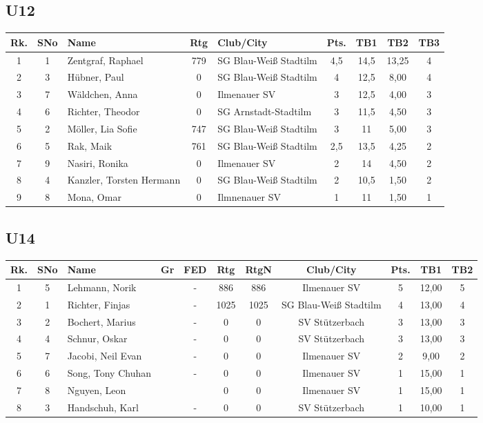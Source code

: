\documentclass[a4paper,ngerman]{tui-algo-seminar}
\begin{document}
\subsection{U12}
\begin{center}
	\begin{tabular}{|c|c|l|c|l|c|c|c|c|}
		\hline
		\textbf{Rk.} & \textbf{SNo} & \textbf{Name} & \textbf{Rtg} & \textbf{Club/City} & \textbf{Pts.} & \textbf{TB1} & \textbf{TB2} & \textbf{TB3} \\
		\hline
		1 & 1 & Zentgraf, Raphael & 779 & SG Blau-Weiß Stadtilm & 4,5 & 14,5 & 13,25 & 4 \\
		2 & 3 & Hübner, Paul & 0 & SG Blau-Weiß Stadtilm & 4 & 12,5 & 8,00 & 4 \\
		3 & 7 & Wäldchen, Anna & 0 & Ilmenauer SV & 3 & 12,5 & 4,00 & 3 \\
		4 & 6 & Richter, Theodor & 0 & SG Arnstadt-Stadtilm & 3 & 11,5 & 4,50 & 3 \\
		5 & 2 & Möller, Lia Sofie & 747 & SG Blau-Weiß Stadtilm & 3 & 11 & 5,00 & 3 \\
		6 & 5 & Rak, Maik & 761 & SG Blau-Weiß Stadtilm & 2,5 & 13,5 & 4,25 & 2 \\
		7 & 9 & Nasiri, Ronika & 0 & Ilmenauer SV & 2 & 14 & 4,50 & 2 \\
		8 & 4 & Kanzler, Torsten Hermann & 0 & SG Blau-Weiß Stadtilm & 2 & 10,5 & 1,50 & 2 \\
		9 & 8 & Mona, Omar & 0 & Ilmnenauer SV & 1 & 11 & 1,50 & 1 \\
		\hline
	\end{tabular}
\end{center}

\subsection{U14}
\begin{center}
	\begin{tabular}{|c|c|l|c|c|c|c|c|c|c|c|}
		\hline
		\textbf{Rk.} & \textbf{SNo} & \textbf{Name} & \textbf{Gr} & \textbf{FED} & \textbf{Rtg} & \textbf{RtgN} & \textbf{Club/City} & \textbf{Pts.} & \textbf{TB1} & \textbf{TB2} \\
		\hline
		1 & 5 & Lehmann, Norik & & - & 886 & 886 & Ilmenauer SV & 5 & 12,00 & 5 \\
		2 & 1 & Richter, Finjas & & - & 1025 & 1025 & SG Blau-Weiß Stadtilm & 4 & 13,00 & 4 \\
		3 & 2 & Bochert, Marius & & - & 0 & 0 & SV Stützerbach & 3 & 13,00 & 3 \\
		4 & 4 & Schnur, Oskar & & - & 0 & 0 & SV Stützerbach & 3 & 13,00 & 3 \\
		5 & 7 & Jacobi, Neil Evan & & - & 0 & 0 & Ilmenauer SV & 2 & 9,00 & 2 \\
		6 & 6 & Song, Tony Chuhan & & - & 0 & 0 & Ilmenauer SV & 1 & 15,00 & 1 \\
		7 & 8 & Nguyen, Leon & & & 0 & 0 & Ilmenauer SV & 1 & 15,00 & 1 \\
		8 & 3 & Handschuh, Karl & & - & 0 & 0 & SV Stützerbach & 1 & 10,00 & 1 \\
		\hline
	\end{tabular}
\end{center}
\end{document}
